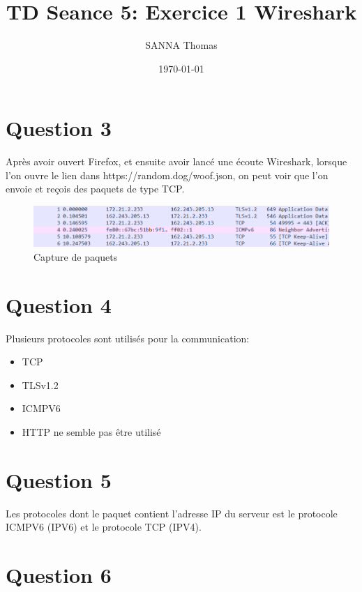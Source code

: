 \documentclass{article}
\begin{document}
\begin{titlepage}
  \title{TD Seance 5: Exercice 1 Wireshark}
  \author{SANNA Thomas}
  \date{\today}
  \maketitle
\end{titlepage}

\section*{Question 3}

Après avoir ouvert Firefox, et ensuite avoir lancé une écoute Wireshark, lorsque l'on ouvre le lien dans https://random.dog/woof.json, on peut voir que l'on envoie et reçois des paquets de type TCP.

\begin{figure}[H]
  \includegraphics[width=\linewidth]{resRandomDog.png}
  \caption{Capture de paquets}
  \label{fig:resRandomDog}
\end{figure}

\section*{Question 4}

Plusieurs protocoles sont utilisés pour la communication:

\begin{itemize}
  \item TCP
  \item TLSv1.2
  \item ICMPV6
  \item HTTP ne semble pas être utilisé
\end{itemize}

\section*{Question 5}

Les protocoles dont le paquet contient l'adresse IP du serveur est le protocole ICMPV6 (IPV6) et le protocole TCP (IPV4).

\section*{Question 6}
\end{document}
